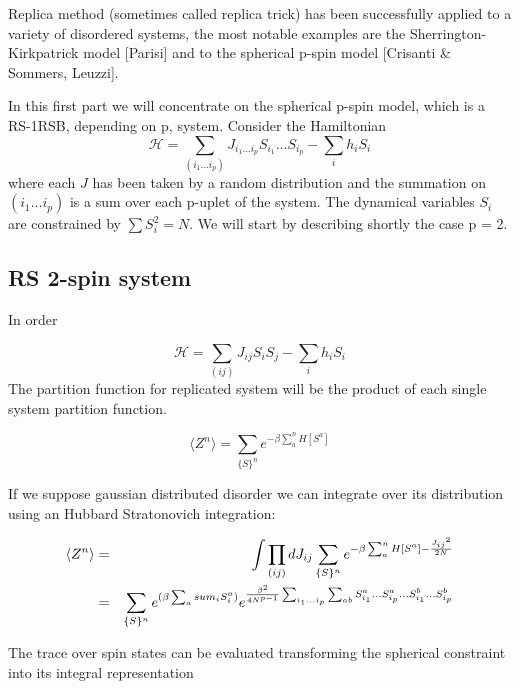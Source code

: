\documentclass{article}
\begin{document}
  Replica method (sometimes called replica trick) has been successfully
  applied to a variety of disordered systems, the most notable examples are
  the Sherrington-Kirkpatrick model [Parisi] and to the spherical p-spin model
  [Crisanti & Sommers, Leuzzi].

In this first part we will concentrate on the spherical p-spin model, which is
a RS-1RSB, depending on p, system. Consider the Hamiltonian
\begin{equation}
  \mathcal{H} = \sum_{(i_1 \ldots i_p)} J_{i_1 \ldots i_p} S_{i_1} \ldots
  S_{i_p} - \sum_i h_i S_i
\end{equation}
where each $J$ has been taken by a random distribution and the summation on
$(i_1 \ldots i_p)$ is a sum over each p-uplet of the system.  
The dynamical variables $S_i$ are constrained by $\sum S_i^2 = N$. We will start by describing
shortly the case p = 2.

\subsection{RS 2-spin system}

In order

\begin{equation}
  \mathcal{H} = \sum_{(ij)} J_{ij} S_i S_j - \sum_i h_i S_i
\end{equation}
The partition function for replicated system will be the product of each single system partition function.

\begin{equation}
  \langle Z^n \rangle = \sum_{\{S\}^n} e^{- \beta \sum_a^n H [S^a]}
\end{equation}

If we suppose gaussian distributed disorder we can integrate over its distribution using an Hubbard Stratonovich integration: 

\begin{eqnarray}
  \langle Z^n \rangle &=& \int \prod_{(ij)} d J_{ij} \sum_{\{S\}^n} e^{- \beta \sum_a^n H [S^a] - {{J_{ij}}^2\over {2N}} } \\  
&=&  \sum_{\{S\}^n} e^{(\beta \sum_a sum_i S_i ^a)} e^{   {   {\beta^2}       \over    {4N^{p-1} }   }  \sum_{i_1\dots i_p}  \sum_{ab} S_{i_1}^a\dots S_{i_p}^a \dots S_{i_1}^b \dots S_{i_p}^b                    }
\end{eqnarray}

The trace over spin states can be evaluated transforming the spherical constraint into its integral representation
\end{document}
